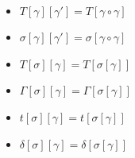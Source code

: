 \begin{lemma}$ $
  \begin{itemize}
  \item $T[\gamma][\gamma'] = T[\gamma \circ \gamma]$
  \item $\sigma[\gamma][\gamma'] = \sigma[\gamma \circ \gamma]$
  \item $T[\sigma][\gamma] = T[\sigma[\gamma]]$
  \item $\Gamma[\sigma][\gamma] = \Gamma[\sigma[\gamma]]$
  \item $t[\sigma][\gamma] = t[\sigma[\gamma]]$
  \item $\delta[\sigma][\gamma] = \delta[\sigma[\gamma]]$
  \end{itemize}
\end{lemma}

